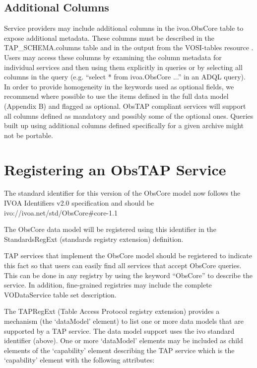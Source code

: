 \documentclass[11pt,a4paper]{ivoa}
\begin{document}
\subsection{Additional Columns}
\label{bkm:Ref421295535}\label{bkm:Ref421297012}Service providers may include additional columns in the ivoa.ObsCore
table to expose additional metadata. These columns must be described in the TAP\_SCHEMA.columns table and in the output
from the VOSI-tables resource \citep{2011ivoa.spec.0531G}. Users may access these columns by examining the column
metadata for individual services and then using them explicitly in queries or by selecting all columns in the query
(e.g. ``select * from ivoa.ObsCore ...'' in an ADQL query).  In order to provide homogeneity in the keywords used as
optional fields, we recommend where possible to use the items defined in the full data model (Appendix B) and flagged
as optional. ObsTAP compliant services will support all columns defined as mandatory and possibly some of the optional
ones. Queries built up using additional columns defined specifically for a given archive might not be portable.

\section{Registering an ObsTAP Service}
\label{sec:obstap-register}The standard identifier for this version of the ObsCore model now follows the IVOA Identifiers
v2.0 specification \citep{2016ivoa.spec.0523D} and should be ivo://ivoa.net/std/ObsCore\#core-1.1

The ObsCore data model will be registered using this identifier in the StandardsRegExt (standards registry extension)
definition.

TAP services that implement the ObsCore model should be registered to indicate this fact so that users can easily find
all services that accept ObsCore queries. This can be done in any registry by using the keyword ``ObsCore'' to describe
the service. In addition, fine-grained registries may include the complete VODataService table set description.

The TAPRegExt (Table Access Protocol registry extension) \citep{2012ivoa.spec.0827D}  provides a mechanism (the
`dataModel' element) to list one or more data models that are supported by a TAP service. The data model support uses
the ivo standard identifier (above). One or more `dataModel' elements may be included as child elements of the
{}`capability' element describing the TAP service which is the `capability' element with the following attributes:
\end{document}
